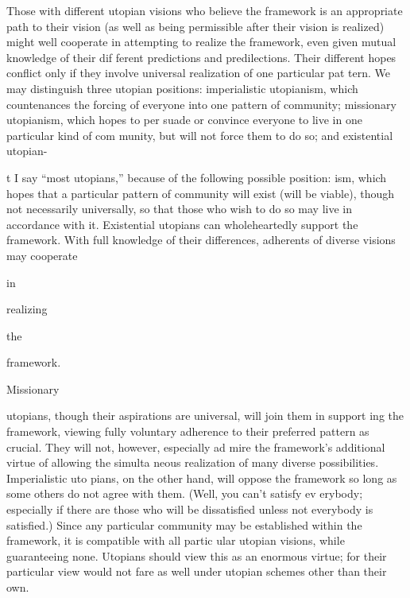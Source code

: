 \documentclass[11pt,openany]{book}
\begin{document}
Those with different utopian visions who believe the framework is an appropriate path to their vision (as well as being permissible after their vision is realized) might well cooperate in attempting to realize the framework, even given mutual knowledge of their dif ferent predictions and predilections. Their different hopes conflict only if they involve universal realization of one particular pat tern. We may distinguish three utopian positions: imperialistic utopianism, which countenances the forcing of everyone into one pattern of community; missionary utopianism, which hopes to per suade or convince everyone to live in one particular kind of com munity, but will not force them to do so; and existential utopian-

t I say ``most utopians,'' because of the following possible position: ism, which hopes that a particular pattern of community will exist (will be viable), though not necessarily universally, so that those who wish to do so may live in accordance with it. Existential utopians can wholeheartedly support the framework. With full knowledge of their differences, adherents of diverse visions may cooperate 

in 

realizing 

the 

framework. 

Missionary 

utopians, though their aspirations are universal, will join them in support ing the framework, viewing fully voluntary adherence to their preferred pattern as crucial. They will not, however, especially ad mire the framework's additional virtue of allowing the simulta neous realization of many diverse possibilities. Imperialistic uto pians, on the other hand, will oppose the framework so long as some others do not agree with them. (Well, you can't satisfy ev erybody; especially if there are those who will be dissatisfied unless not everybody is satisfied.) Since any particular community may be established within the framework, it is compatible with all partic ular utopian visions, while guaranteeing none. Utopians should view this as an enormous virtue; for their particular view would not fare as well under utopian schemes other than their own. 
\end{document}
